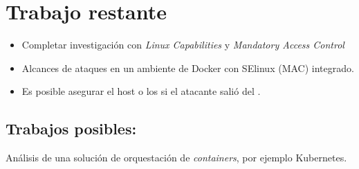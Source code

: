 \documentclass[letter,10pt]{article}
\begin{document}
\section{Trabajo restante}

\begin{itemize}
	\item Completar investigación con \emph{Linux Capabilities} y \emph{Mandatory Access Control}
	\item Alcances de ataques en un ambiente de Docker con SElinux (MAC) integrado.
	\item Es posible asegurar el host o los \containers   si el atacante salió del \container.
\end{itemize}
\subsection{Trabajos posibles:}
Análisis de una solución de orquestación de \emph{containers}, por ejemplo Kubernetes.




\end{document}
